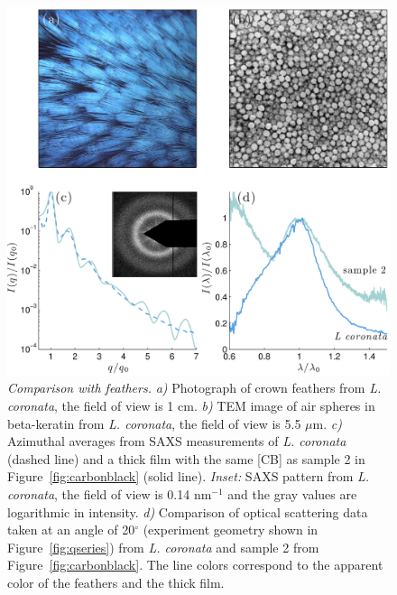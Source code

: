 \begin{figure}[htbp]
\centering
\includegraphics[width=.9\textwidth]{figures/birdcomparison_100128.pdf}
\caption{\label{fig:birdcomparison} \emph{Comparison with feathers.} 	
	\emph{a)} Photograph of crown feathers from \emph{L. coronata}, the field of view is 1 cm. 
	\emph{b)} TEM image of air spheres in beta-keratin from \emph{L. coronata}, the field of view is 5.5 $\mu$m. 
	\emph{c)} Azimuthal averages from SAXS measurements of \emph{L. coronata} (dashed line) and a thick film with the same [CB] as sample 2 in Figure~\ref{fig:carbonblack} (solid line). \emph{Inset:} SAXS pattern from \emph{L. coronata}, the field of view is 0.14 nm$^{-1}$ and the gray values are logarithmic in intensity. 
	\emph{d)} Comparison of optical scattering data taken at an angle of 20$^{\circ}$ (experiment geometry shown in Figure~\ref{fig:qseries}) from \emph{L. coronata} and sample 2 from Figure~\ref{fig:carbonblack}.  The line colors correspond to the apparent color of the feathers and the thick film.}
\end{figure}
